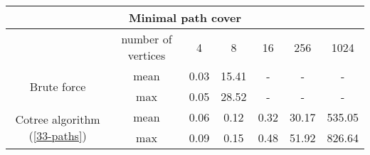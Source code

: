 \begin{center}
    \begin{tabular}{|c|c|c|c|c|c|c|}
        \hline
        \multicolumn{7}{|c|}{Minimal path cover}                                                                       \\
        \hline
                                                           & number of vertices & 4    & 8     & 16   & 256   & 1024   \\
        \hline

        \multirow{2}{*}{Brute force}                       & mean               & 0.03 & 15.41 & -    & -     & -      \\
                                                           & max                & 0.05 & 28.52 & -    & -     & -      \\
        \hline
        \multirow{2}{*}{Cotree algorithm (\ref{33-paths})} & mean               & 0.06 & 0.12  & 0.32 & 30.17 & 535.05 \\
                                                           & max                & 0.09 & 0.15  & 0.48 & 51.92 & 826.64 \\
        \hline
    \end{tabular}
\end{center}
